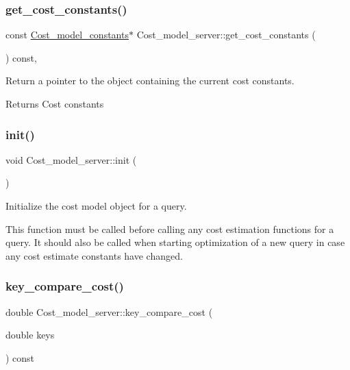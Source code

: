 \subsubsection{\texorpdfstring{get\+\_\+cost\+\_\+constants()}{get\_cost\_constants()}}
{\footnotesize\ttfamily const \mbox{\hyperlink{classCost__model__constants}{Cost\+\_\+model\+\_\+constants}}$\ast$ Cost\+\_\+model\+\_\+server\+::get\+\_\+cost\+\_\+constants (\begin{DoxyParamCaption}{ }\end{DoxyParamCaption}) const\hspace{0.3cm}{\ttfamily [inline]}, {\ttfamily [protected]}}

Return a pointer to the object containing the current cost constants.

\begin{DoxyReturn}{Returns}
Cost constants 
\end{DoxyReturn}
\mbox{\label{classCost__model__server_a267c97e430cec8665c0c62ad722d80c1}} 
\subsubsection{\texorpdfstring{init()}{init()}}
{\footnotesize\ttfamily void Cost\+\_\+model\+\_\+server\+::init (\begin{DoxyParamCaption}{ }\end{DoxyParamCaption})}

Initialize the cost model object for a query.

This function must be called before calling any cost estimation functions for a query. It should also be called when starting optimization of a new query in case any cost estimate constants have changed. \mbox{\label{classCost__model__server_a8315c6b7726cc01fda328159ad6c97f5}} 
\subsubsection{\texorpdfstring{key\+\_\+compare\+\_\+cost()}{key\_compare\_cost()}}
{\footnotesize\ttfamily double Cost\+\_\+model\+\_\+server\+::key\+\_\+compare\+\_\+cost (\begin{DoxyParamCaption}\item[{double}]{keys }\end{DoxyParamCaption}) const\hspace{0.3cm}{\ttfamily [inline]}}

